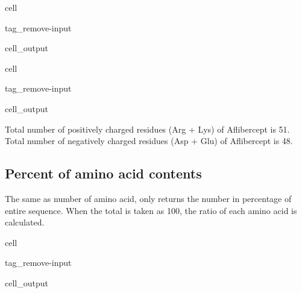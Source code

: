 \documentclass[letterpaper,10pt,english]{jupyterBook}
\begin{document}
\begin{sphinxuseclass}{cell}
\begin{sphinxuseclass}{tag_remove-input}\begin{sphinxVerbatimOutput}

\begin{sphinxuseclass}{cell_output}
\noindent{}

\end{sphinxuseclass}\end{sphinxVerbatimOutput}

\end{sphinxuseclass}
\end{sphinxuseclass}
\begin{sphinxuseclass}{cell}
\begin{sphinxuseclass}{tag_remove-input}\begin{sphinxVerbatimOutput}

\begin{sphinxuseclass}{cell_output}
\begin{sphinxVerbatim}[commandchars=\\\{\}]
Total number of positively charged residues (Arg + Lys) of Aflibercept is 51.
Total number of negatively charged residues (Asp + Glu) of Aflibercept is 48.
\end{sphinxVerbatim}

\end{sphinxuseclass}\end{sphinxVerbatimOutput}

\end{sphinxuseclass}
\end{sphinxuseclass}

\subsection{Percent of amino acid contents}
\label{\detokenize{ipynb/chapter1:percent-of-amino-acid-contents}}
\sphinxAtStartPar
The same as number of amino acid, only returns the number in percentage of entire sequence. When the total is taken as 100, the ratio of each amino acid is calculated.

\begin{sphinxuseclass}{cell}
\begin{sphinxuseclass}{tag_remove-input}\begin{sphinxVerbatimOutput}

\begin{sphinxuseclass}{cell_output}
\noindent{}

\end{sphinxuseclass}\end{sphinxVerbatimOutput}

\end{sphinxuseclass}
\end{sphinxuseclass}
\end{document}
